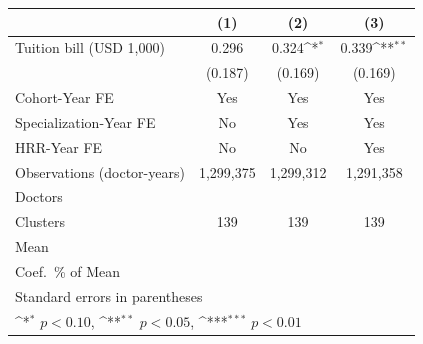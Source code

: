 {
\def\sym#1{\ifmmode^{#1}\else\(^{#1}\)\fi}
\begin{tabular}{l*{3}{c}}
\hline\hline
                    &\multicolumn{1}{c}{(1)}         &\multicolumn{1}{c}{(2)}         &\multicolumn{1}{c}{(3)}         \\
\hline
Tuition bill (USD 1,000)&       0.296         &       0.324\sym{*}  &       0.339\sym{**} \\
                    &     (0.187)         &     (0.169)         &     (0.169)         \\
[1em]
Cohort-Year FE      &         Yes         &         Yes         &         Yes         \\
[1em]
Specialization-Year FE&          No         &         Yes         &         Yes         \\
[1em]
HRR-Year FE         &          No         &          No         &         Yes         \\
\hline
Observations (doctor-years)&   1,299,375         &   1,299,312         &   1,291,358         \\
Doctors             &                     &                     &                     \\
Clusters            &         139         &         139         &         139         \\
Mean                &                     &                     &                     \\
Coef.\ \% of Mean   &                     &                     &                     \\
\hline\hline
\multicolumn{4}{l}{\footnotesize Standard errors in parentheses}\\
\multicolumn{4}{l}{\footnotesize \sym{*} \(p<0.10\), \sym{**} \(p<0.05\), \sym{***} \(p<0.01\)}\\
\end{tabular}
}
